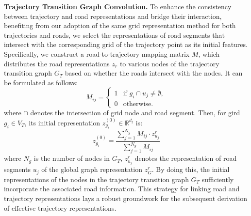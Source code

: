 \noindent \textbf{Trajectory Transition Graph Convolution.}
To enhance the consistency between trajectory and road representations and bridge their interaction, benefiting from our adoption of the same grid representation method for both trajectories and roads, we select the representations of road segments that intersect with the corresponding grid of the trajectory point as its initial features. Specifically, we construct a road-to-trajectory mapping matrix $M$, which distributes the road representations $z_r$ to various nodes of the trajectory transition graph $G_T$ based on whether the roads intersect with the nodes. It can be formulated as follows:
\begin{equation}
    M_{ij} = 
  \begin{cases} 
   1 & \text{if } g_i \cap u_j \neq \emptyset, \\
   0 & \text{otherwise}.
  \end{cases}
\end{equation}
where $\cap$ denotes the intersection of grid node and road segment. Then, for gird $g_i \in V_T$, its initial representation $z^{(0)}_{g_i} \in \mathbb{R}^{d_t}$ is:
\begin{equation}
    z^{(0)}_{g_i} = \frac{\sum_{j=1}^{N_g} M_{ij} \cdot z^r_{u_j}}{\sum_{j=1}^{N_g} M_{ij}}
\end{equation}
where $N_g$ is the number of nodes in $G_T$, $z^r_{u_j}$ denotes the representation of road segments $u_j$ of the global graph representation $z_G^r$. By doing this, the initial representations of the nodes in the trajectory transition graph $G_T$ sufficiently incorporate the associated road information. This strategy for linking road and trajectory representations lays a robust groundwork for the subsequent derivation of effective trajectory representations.

